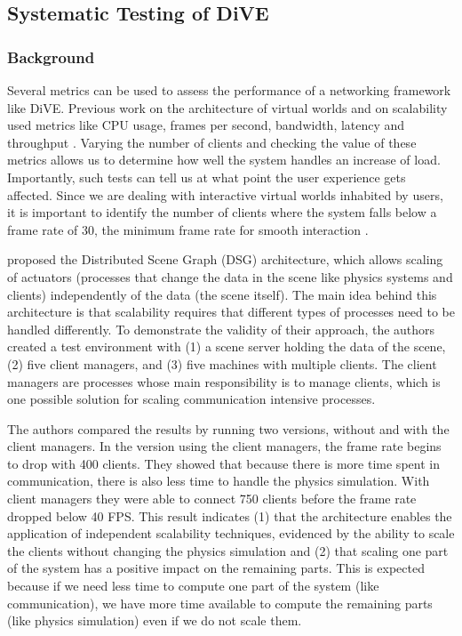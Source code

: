 \documentclass[]{elsarticle}
\begin{document}
\subsection{Systematic Testing of DiVE}

\subsubsection{Background}

Several metrics can be used to assess the performance of a networking framework like DiVE. Previous work on the architecture of virtual worlds and on scalability used metrics like CPU usage, frames per second, bandwidth, latency and throughput \cite{Lake+others.2010,Horn+others.2010,Liu+others.2010}. Varying the number of clients and checking the value of these metrics allows us to determine how well the system handles an increase of load. Importantly, such tests can tell us at what point the user experience gets affected. Since we are dealing with interactive virtual worlds inhabited by users, it is important to identify the number of clients where the system falls below a frame rate of 30, the minimum frame rate for smooth interaction \cite{Kumar+others.2008}.

\cite{Lake+others.2010} proposed the Distributed Scene Graph (DSG) architecture, which allows scaling of actuators (processes that change the data in the scene like physics systems and clients) independently of the data (the scene itself). The main idea behind this architecture is that scalability requires that different types of processes need to be handled differently. To demonstrate the validity of their approach, the authors created a test environment with (1) a scene server holding the data of the scene, (2) five client managers, and (3) five machines with multiple clients. The client managers are processes whose main responsibility is to manage clients, which is one possible solution for scaling communication intensive processes.

The authors compared the results by running two versions, without and with the client managers. In the version using the client managers, the frame rate begins to drop with 400 clients. They showed that because there is more time spent in communication, there is also less time to handle the physics simulation. With client managers they were able to connect 750 clients before the frame rate dropped below 40 FPS. This result indicates (1) that the architecture enables the application of independent scalability techniques, evidenced by the ability to scale the clients without changing the physics simulation and (2) that scaling one part of the system has a positive impact on the remaining parts. This is expected because if we need less time to compute one part of the system (like communication), we have more time available to compute the remaining parts (like physics simulation) even if we do not scale them.
\end{document}
